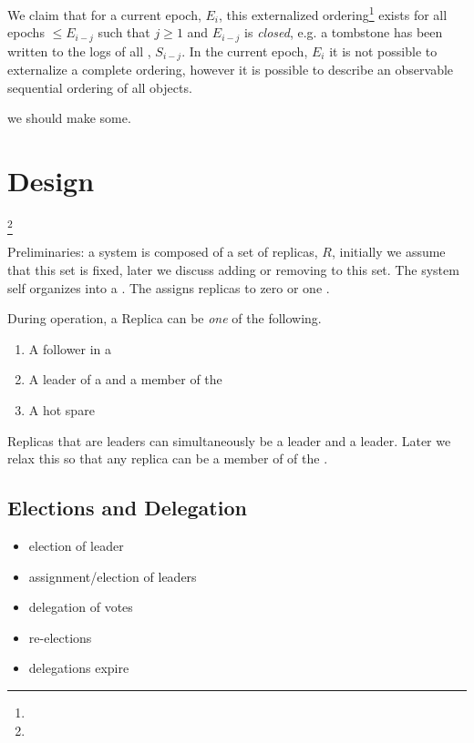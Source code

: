 \documentclass[10pt,twocolumn]{article}
\begin{document}
 We claim that for a current epoch, $E_i$,
this externalized ordering\footnote{} exists
for all epochs $\leq E_{i-j}$ such that $j\geq1$ and $E_{i-j}$ is
\emph{closed}, e.g. a tombstone has been written to the logs of all \subs,
$S_{i-j}$.
In the current epoch, $E_i$ it is not possible to externalize a complete
ordering,  however it is possible to describe an observable sequential
ordering of all objects.

 we should make some.

\section*{Design}\footnote{}

Preliminaries: a system is composed of a set of replicas, $R$, initially we
assume that this set is fixed, later we discuss adding or removing to this
set.
The system self organizes into a \roo.
The \roo assigns replicas to zero or one \subs.

During operation, a Replica can be \emph{one} of the following.

\begin{enumerate}
    \item A follower in a \sub
    \item A leader of a \sub and a member of the \roo
    \item A hot spare
\end{enumerate}

Replicas that are leaders can simultaneously be a \sub leader and a \roo
leader.
Later we relax this so that any replica can be a member of of the \roo.

\subsection*{Elections and Delegation}

\begin{itemize}
    \item election of \roo leader
    \item assignment/election of \sub leaders
    \item delegation of votes
    \item re-elections
    \item delegations expire
\end{itemize}
\end{document}
